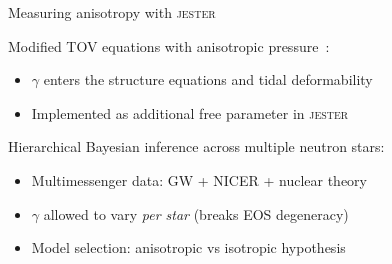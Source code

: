 \documentclass[usenames,dvipsnames,t]{beamer}
\begin{document}
\begin{frame}{Measuring anisotropy with \textsc{jester}}

  \def\x{3mm}
  \def\y{1mm}

  Modified TOV equations with anisotropic pressure~\cite{Pang:2025fes}:
  \begin{itemize}
    \vspace{\y}
    \item $\gamma$ enters the structure equations and tidal deformability
    \vspace{\y}
    \item Implemented as additional free parameter in \textsc{jester}
  \end{itemize}

  \pause
  \vspace{\x}

  Hierarchical Bayesian inference across multiple neutron stars:
  \begin{itemize}
    \vspace{\y}
    \item Multimessenger data: GW + NICER + nuclear theory
    \vspace{\y}
    \item $\gamma$ allowed to vary \emph{per star} (breaks EOS degeneracy)
    \vspace{\y}
    \item Model selection: anisotropic vs isotropic hypothesis
  \end{itemize}

\end{frame}
\end{document}
